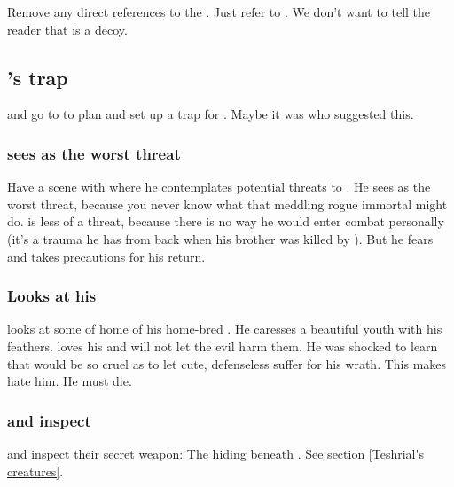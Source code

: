 Remove any direct references to the \Malcur \nexus. 
Just refer to . 
We don't want to tell the reader that \Forclin{} is a decoy. 









\subsection{\Teshrial's trap}
\Teshrial and \Urizeth go to \Malcur to plan and set up a trap for \Ishnaruchaefir. 
Maybe it was \Azraid who suggested this. 





\subsubsection{\Teshrial{} sees \Ishnaruchaefir{} as the worst threat}
Have a scene with \Teshrial{} where he contemplates potential threats to \Malcur. 
He sees \Ishnaruchaefir{} as the worst threat, because you never know what that meddling rogue immortal might do. 
\Secherdamon{} is less of a threat, because there is no way he would enter combat personally (it's a trauma he has from back when his brother was killed by \resphain). 
But he fears \Ishnaruchaefir{} and takes precautions for his return. 





\subsubsection{Looks at his \humans}
\Teshrial{} looks at some of home of his home-bred \humans. 
He caresses a beautiful youth with his feathers. 
\Teshrial{} loves his \humans{} and will not let the evil \Ishnaruchaefir{} harm them. 
He was shocked to learn that \Ishnaruchaefir{} would be so cruel as to let cute, defenseless \humans{} suffer for his wrath. 
This makes \Teshrial{} hate him.
He must die. 





\subsubsection{\Teshrial and \Urizeth inspect \noggyaleth}
\Teshrial and \Urizeth inspect their secret weapon: 
The \noggyaleth{} hiding beneath \Malcur. 
See section \ref{Teshrial's creatures}. 

